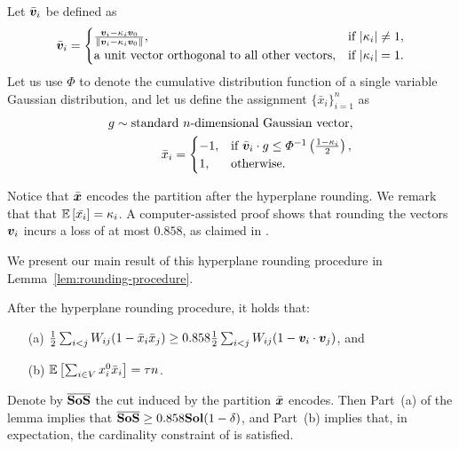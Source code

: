 Let $\bar{\bm{v}}_i$ be defined as
\begin{equation*}
	\bar{\bm{v}}_i = \begin{cases}
		\frac{\bm{v}_i - \kappa_i \bm{v}_0 }{ \| \bm{v}_i - \kappa_i \bm{v}_0\| }, & \textrm{if } |\kappa_i| \neq 1,\\
		\textrm{a unit vector orthogonal to all other vectors}, 			   & \textrm{if } |\kappa_i| = 1.
	\end{cases} 
\end{equation*}
 Let us use $\varPhi$ to denote the cumulative distribution function of 
 a single variable Gaussian distribution, and let us define the assignment $\{\bar{x}_i\}_{i=1}^n$ as 
\begin{equation*}
	\begin{split}
	g \sim 		\textrm{standard $n$-dimensional Gaussian vector},\\
	\bar{x}_i = \begin{cases}
		-1, & \textrm{if } \bar{\bm{v}}_i \cdot g \leq \varPhi^{-1}\left( \frac{1-\kappa_i}{2} \right),\\
		1,  & \textrm{otherwise.}
	\end{cases}
	\end{split}
\end{equation*}


Notice that $\bar{\bm{x}}$ encodes the partition after the hyperplane rounding. 
We remark that that $\mathbb{E}\left[ \bar{x_i} \right] = \kappa_i$. A computer-assisted proof shows that rounding the vectors $\bm{v}_i$  incurs a loss of at most $0.858$, as claimed in \citet[Section 5.4]{DBLP:conf/soda/RaghavendraT12}. 

We present our main result of this hyperplane rounding procedure in Lemma~\ref{lem:rounding-procedure}.

\begin{lemma}
\label{lem:rounding-procedure}
After the hyperplane rounding procedure, it holds that:
\begin{enumerate}
	\item[(a)] $\frac{1}{2} \sum_{i<j} W_{ij}(1 - \bar{x}_i \bar{x}_j) \geq 0.858 \frac{1}{2}\sum_{i<j}W_{ij} (1-\bm{v}_i \cdot \bm{v}_j)$, and
	\item[(b)] $\mathbb{E}\left[ \sum_{i\in V} x_i^0 \bar{x}_i \right] = \tau n$.
\end{enumerate}
\end{lemma}

Denote by $\overline{\mathbf{SoS}}$ the cut induced by the partition $\bar{\bm{x}}$
encodes. Then Part~(a) of the lemma implies that $\overline{\mathbf{SoS}} \geq 0.858
\mathbf{Sol} (1-\delta)$, and Part~(b) implies that, in expectation, the cardinality
constraint of \maxcutkc is satisfied. 


